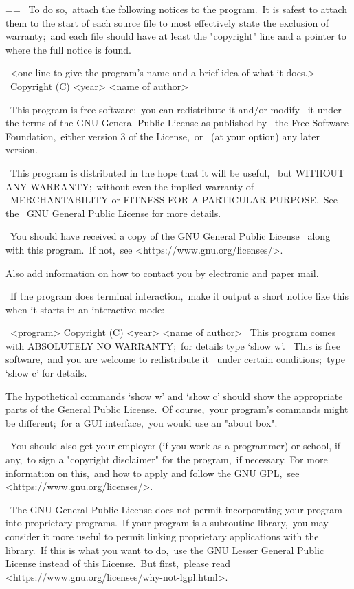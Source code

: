 \documentclass{book}
\makeatletter
\newenvironment{Texinfopreformatted}{%
  \par\GNUTobeylines\obeyspaces\frenchspacing\parskip=\z@\parindent=\z@}{}
{\catcode`\^^M=13 \gdef\GNUTobeylines{\catcode`\^^M=13 \def^^M{\null\par}}}
\newenvironment{Texinfoindented}{\begin{list}{}{}\item\relax}{\end{list}}
\renewcommand{\_}{\Texinfounderscore\discretionary{}{}{}}
\makeatother
\begin{document}
\begin{Texinfoindented}
\begin{Texinfopreformatted}
\  To do so,\ attach the following notices to the program.\  It is safest
to attach them to the start of each source file to most effectively
state the exclusion of warranty;\ and each file should have at least
the "copyright" line and a pointer to where the full notice is found.

\    <one line to give the program's name and a brief idea of what it does.>
\    Copyright (C) <year>  <name of author>

\    This program is free software:\ you can redistribute it and/or modify
\    it under the terms of the GNU General Public License as published by
\    the Free Software Foundation,\ either version 3 of the License,\ or
\    (at your option) any later version.

\    This program is distributed in the hope that it will be useful,
\    but WITHOUT ANY WARRANTY;\ without even the implied warranty of
\    MERCHANTABILITY or FITNESS FOR A PARTICULAR PURPOSE.\  See the
\    GNU General Public License for more details.

\    You should have received a copy of the GNU General Public License
\    along with this program.\  If not,\ see <https://www.gnu.org/licenses/>.

Also add information on how to contact you by electronic and paper mail.

\  If the program does terminal interaction,\ make it output a short
notice like this when it starts in an interactive mode:

\    <program>  Copyright (C) <year>  <name of author>
\    This program comes with ABSOLUTELY NO WARRANTY;\ for details type `show w'.
\    This is free software,\ and you are welcome to redistribute it
\    under certain conditions;\ type `show c' for details.

The hypothetical commands `show w' and `show c' should show the appropriate
parts of the General Public License.\  Of course,\ your program's commands
might be different;\ for a GUI interface,\ you would use an "about box".

\  You should also get your employer (if you work as a programmer) or school,
if any,\ to sign a "copyright disclaimer" for the program,\ if necessary.
For more information on this,\ and how to apply and follow the GNU GPL,\ see
<https://www.gnu.org/licenses/>.

\  The GNU General Public License does not permit incorporating your program
into proprietary programs.\  If your program is a subroutine library,\ you
may consider it more useful to permit linking proprietary applications with
the library.\  If this is what you want to do,\ use the GNU Lesser General
Public License instead of this License.\  But first,\ please read
<https://www.gnu.org/licenses/why-not-lgpl.html>.
\end{Texinfopreformatted}
\end{Texinfoindented}
\end{document}
